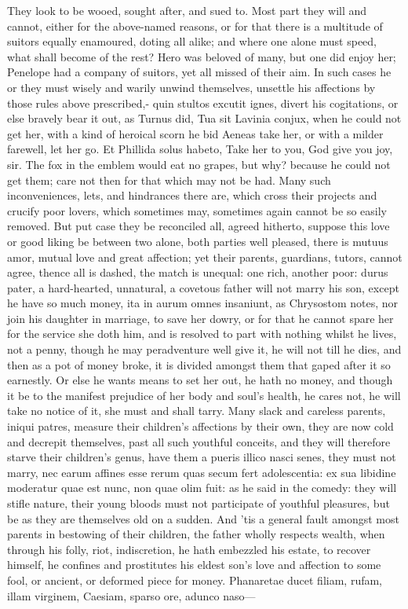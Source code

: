 {They look to be wooed, sought after, and sued to. Most part they will
and cannot, either for the above-named reasons, or for that there is a
multitude of suitors equally enamoured, doting all alike; and where one
alone must speed, what shall become of the rest? Hero was beloved of
many, but one did enjoy her; Penelope had a company of suitors, yet all
missed of their aim. In such cases he or they must wisely and warily
unwind themselves, unsettle his affections by those rules above
prescribed,- quin stultos excutit ignes, divert his cogitations,
or else bravely bear it out, as Turnus did, Tua sit Lavinia conjux,
when he could not get her, with a kind of heroical scorn he bid Aeneas
take her, or with a milder farewell, let her go. Et Phillida solus
habeto, Take her to you, God give you joy, sir. The fox in the emblem
would eat no grapes, but why? because he could not get them; care not
then for that which may not be had.
Many such inconveniences, lets, and hindrances there are, which cross
their projects and crucify poor lovers, which sometimes may, sometimes
again cannot be so easily removed. But put case they be reconciled all,
agreed hitherto, suppose this love or good liking be between two alone,
both parties well pleased, there is mutuus amor, mutual love and great
affection; yet their parents, guardians, tutors, cannot agree, thence
all is dashed, the match is unequal: one rich, another poor: durus
pater, a hard-hearted, unnatural, a covetous father will not marry his
son, except he have so much money, ita in aurum omnes insaniunt, as
Chrysostom notes, nor join his daughter in marriage, to save her
dowry, or for that he cannot spare her for the service she doth him,
and is resolved to part with nothing whilst he lives, not a penny,
though he may peradventure well give it, he will not till he dies, and
then as a pot of money broke, it is divided amongst them that gaped
after it so earnestly. Or else he wants means to set her out, he hath
no money, and though it be to the manifest prejudice of her body and
soul's health, he cares not, he will take no notice of it, she must and
shall tarry. Many slack and careless parents, iniqui patres, measure
their children's affections by their own, they are now cold and
decrepit themselves, past all such youthful conceits, and they will
therefore starve their children's genus, have them a pueris 
illico nasci senes, they must not marry, nec earum affines esse rerum
quas secum fert adolescentia: ex sua libidine moderatur quae est nunc,
non quae olim fuit: as he said in the comedy: they will stifle nature,
their young bloods must not participate of youthful pleasures, but be
as they are themselves old on a sudden. And 'tis a general fault
amongst most parents in bestowing of their children, the father wholly
respects wealth, when through his folly, riot, indiscretion, he hath
embezzled his estate, to recover himself, he confines and prostitutes
his eldest son's love and affection to some fool, or ancient, or
deformed piece for money.
Phanaretae ducet filiam, rufam, illam virginem,
Caesiam, sparso ore, adunco naso---

}
